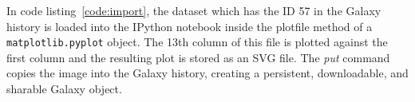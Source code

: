 \documentclass{bioinfo}
\begin{document}
\begin{methods}
In code listing~\ref{code:import}, the dataset which has the ID 57 in the Galaxy history is loaded 
into the IPython notebook inside the plotfile method of a \texttt{matplotlib.pyplot} object. 
The 13th column of this file is plotted against the first column and the
resulting plot is stored as an SVG file. The \textit{put} command copies the image into the Galaxy history, 
creating a persistent, downloadable, and sharable Galaxy object.


%
%
%
%
%
%
%
%
%
%


\end{methods}
\end{document}
